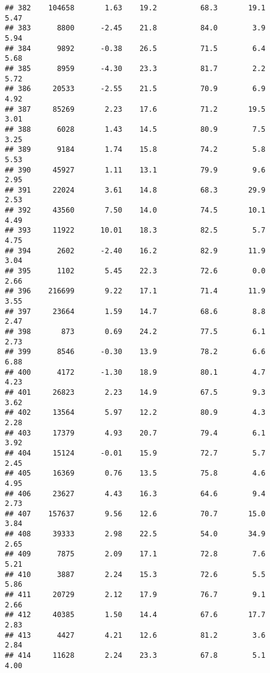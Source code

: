 \documentclass[
]{article}
\begin{document}
\begin{verbatim}
## 382    104658       1.63    19.2          68.3       19.1              5.47
## 383      8800      -2.45    21.8          84.0        3.9              5.94
## 384      9892      -0.38    26.5          71.5        6.4              5.68
## 385      8959      -4.30    23.3          81.7        2.2              5.72
## 386     20533      -2.55    21.5          70.9        6.9              4.92
## 387     85269       2.23    17.6          71.2       19.5              3.01
## 388      6028       1.43    14.5          80.9        7.5              3.25
## 389      9184       1.74    15.8          74.2        5.8              5.53
## 390     45927       1.11    13.1          79.9        9.6              2.95
## 391     22024       3.61    14.8          68.3       29.9              2.53
## 392     43560       7.50    14.0          74.5       10.1              4.49
## 393     11922      10.01    18.3          82.5        5.7              4.75
## 394      2602      -2.40    16.2          82.9       11.9              3.04
## 395      1102       5.45    22.3          72.6        0.0              2.66
## 396    216699       9.22    17.1          71.4       11.9              3.55
## 397     23664       1.59    14.7          68.6        8.8              2.47
## 398       873       0.69    24.2          77.5        6.1              2.73
## 399      8546      -0.30    13.9          78.2        6.6              6.88
## 400      4172      -1.30    18.9          80.1        4.7              4.23
## 401     26823       2.23    14.9          67.5        9.3              3.62
## 402     13564       5.97    12.2          80.9        4.3              2.28
## 403     17379       4.93    20.7          79.4        6.1              3.92
## 404     15124      -0.01    15.9          72.7        5.7              2.45
## 405     16369       0.76    13.5          75.8        4.6              4.95
## 406     23627       4.43    16.3          64.6        9.4              2.73
## 407    157637       9.56    12.6          70.7       15.0              3.84
## 408     39333       2.98    22.5          54.0       34.9              2.65
## 409      7875       2.09    17.1          72.8        7.6              5.21
## 410      3887       2.24    15.3          72.6        5.5              5.86
## 411     20729       2.12    17.9          76.7        9.1              2.66
## 412     40385       1.50    14.4          67.6       17.7              2.83
## 413      4427       4.21    12.6          81.2        3.6              2.84
## 414     11628       2.24    23.3          67.8        5.1              4.00

\end{verbatim}
\end{document}
